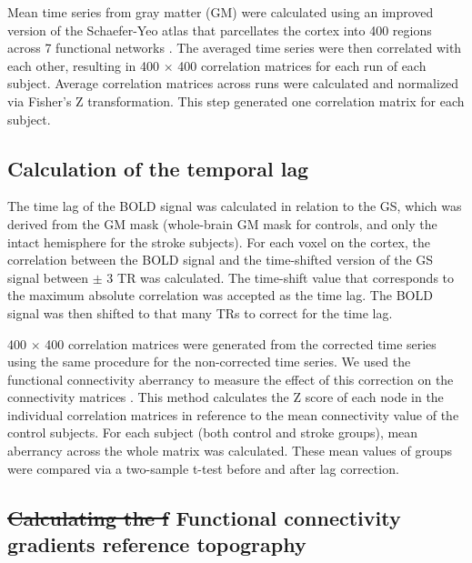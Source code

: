 \documentclass[fleqn,10pt]{wlscirep}
\begin{document}
Mean time series from gray matter (GM) were calculated using an improved version of the Schaefer-Yeo atlas that parcellates the cortex into 400 regions across 7 functional networks \citep{Schaefer_2017, glen2021improved}. The averaged time series were then correlated with each other, resulting in \color{blue}400 $\times$ 400 \color{black}correlation matrices for each run of each subject. Average correlation matrices across runs were calculated and normalized via Fisher's Z transformation. This step generated one correlation matrix for each subject.

\subsection*{Calculation of the temporal lag}
The time lag of the BOLD signal was calculated in relation to the GS, which was derived from the GM mask (whole-brain GM mask for controls, and only the intact hemisphere for the stroke subjects). For each voxel on the cortex, the correlation between the BOLD signal and the time-shifted version of the GS signal between $\pm$ 3 TR was calculated. The time-shift value that corresponds to the maximum absolute correlation was accepted as the time lag. The BOLD signal was then shifted to that many TRs to correct for the time lag. 

400 $\times$ 400 correlation matrices were generated from the corrected time series using the same procedure for the non-corrected time series. We used the functional connectivity aberrancy to measure the effect of this correction on the connectivity matrices \citep{siegel2016effects}. This method calculates the Z score of each node in the individual correlation matrices in reference to the mean connectivity value of the control subjects. For each subject (both control and stroke groups), mean aberrancy across the whole matrix was calculated. These mean values of groups were compared via a two-sample t-test before and after lag correction.


\subsection*{\color{red} \st{Calculating the f} \color{black}Functional connectivity gradients reference topography}
 
\end{document}
